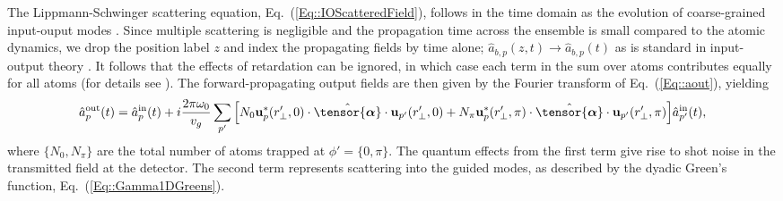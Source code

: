 \documentclass[preprint, aps,pra,onecolumn]{revtex4-1} %
\newcommand{\erf}[1]{Eq.~(\ref{#1})}
\newcommand{\poltens}{\hat{\tensor{\boldsymbol{\alpha}}}}
\begin{document}
The Lippmann-Schwinger scattering equation, \erf{Eq::IOScatteredField}, follows in the time domain as the evolution of coarse-grained input-ouput modes \cite{gardiner_input_1985, fan_input-output_2010, le_kien_propagation_2014}.  
Since multiple scattering is negligible and the propagation time across the ensemble is small compared to the atomic dynamics, we drop the position label $z$ and index the propagating fields by time alone; $\hat{a}_{b,p}(z,t) \rightarrow \hat{a}_{b,p}(t) $ as is standard in input-output theory \cite{gardiner_input_1985, stockton_deterministic_2004} . 
It follows that the effects of retardation can be ignored, in which case each term in the sum over atoms contributes equally for all atoms (for details see \cite{le_kien_correlations_2008, baragiola_open_2014}).  
The forward-propagating output fields are then given by the Fourier transform of \erf{Eq::aout}, yielding \cite{le_kien_correlations_2008} 
\begin{align} \label{Eq::ScatteringSolution}
		\hat{a}^{\rm out}_{p}(t) = \hat{a}^{\rm in}_{p}(t) + i  \frac{2\pi \omega_0}{v_g}\sum_{p'}\Big[ N_0  \mathbf{u}^*_p(r'_\perp,0) \cdot \poltens \cdot  \mathbf{u}_{p'}(r'_\perp,0)  + N_\pi \mathbf{u}^*_p(r'_\perp,\pi) \cdot \poltens \cdot  \mathbf{u}_{p'}(r'_\perp,\pi) \Big] \hat{a}^{\rm in}_{p'}(t), 
	\end{align} 
where $\{N_0,N_\pi \}$ are the total number of atoms trapped at $\phi' = \{0,\pi\}$. The quantum effects from the first term give rise to shot noise in the transmitted field at the detector.  
The second term represents scattering into the guided modes, as described by the dyadic Green's function, \erf{Eq::Gamma1DGreens}.  
\end{document}
